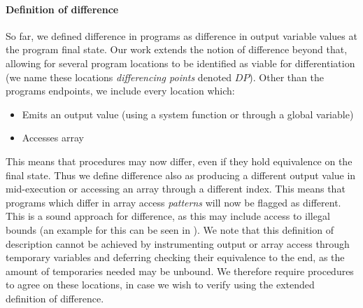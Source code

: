 
\paragraph{Definition of difference}
So far, we defined difference in programs as difference in output variable values at the program final state. Our work extends the notion of difference beyond that, allowing for several program locations to be identified as viable for differentiation (we name these locations \emph{differencing points} denoted $DP$). Other than the programs endpoints, we include every location which:
\begin{itemize}
\item Emits an output value (using a system function or through a global variable)
\item Accesses array
\end{itemize}
This means that procedures may now differ, even if they hold equivalence on the final state. Thus we define difference also as producing a different output value in mid-execution or accessing an array through a different index. This means that programs which differ in array access \emph{patterns} will now be flagged as different. This is a sound approach for difference, as this may include access to illegal bounds (an example for this can be seen in ). We note that this definition of description cannot be achieved by instrumenting output or array access through temporary variables and deferring checking their equivalence to the end, as the amount of temporaries needed may be unbound. We therefore require procedures to agree on these locations, in case we wish to verify using the extended definition of difference. 